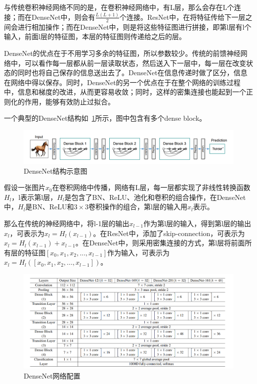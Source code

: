 与传统卷积神经网络不同的是，在卷积神经网络中，有L层，那么会存在L个连接；而在DenseNet中，则会有$\frac{L(L+1)}{2}$个连接。ResNet中，在将特征传给下一层之间会进行相加操作；而在DenseNet中，则是将这些特征图进行拼接，即第l层有l个输入，前面l层的特征图，本层的特征图则传递给之后的层。

DenseNet的优点在于不用学习多余的特征图，所以参数较少。传统的前馈神经网络中，可以看作每一层都从前一层读取状态，然后送入下一层中，每一层在改变状态的同时也将自己保存的信息送出去了。DenseNet在信息传递时做了区分，信息在网络中得以保存。同时，DenseNet的另一个优点在于在整个网络的训练过程中，信息和梯度的改进，从而更容易收敛；同时，这样的密集连接也能起到一个正则化的作用，能够有效防止过拟合。

一个典型的DenseNet结构如~\ref{fig:DenseNet_net}所示，图中包含有多个dense block。

\begin{figure}[htbp]
	\centering
	\includegraphics[width=\linewidth]{readings_figures/DenseNet_net.png}
	\caption{DenseNet结构示意图}
	\label{fig:DenseNet_net}
\end{figure}

假设一张图片$x_0$在卷积网络中传播，网络有L层，每一层都实现了非线性转换函数$H_l$，l表示第l层，$H_l$是包含了BN、ReLU、池化和卷积的组合操作，在DenseNet中，$H_l$是BN、ReLU和$3\times3$卷积操作的组合，第l层的输入用$x_l$表示。

那么在传统的神经网络中，将l-1层的输出$x_{l-1}$作为第l层的输入，得到第l层的输出$x_l$，可表示为$x_l=H_l(x_{l-1})$。在ResNet中，添加了skip-connection，可表示为$x_l=H_l(x_{l-1})+x_{l-1}$。在DenseNet中，则采用密集连接的方式，第l层将前面所有层的特征图$[x_0,x_1,x_2,...,x_{l-1}]$作为输入，可表示为$x_l=H_l([x_0,x_1,x_2,...,x_{l-1}])$。

\begin{figure}[htbp]
	\centering
	\includegraphics[width=\linewidth]{readings_figures/DenseNet_params.png}
	\caption{DenseNet网络配置}
	\label{fig:DenseNet_params}
\end{figure}


